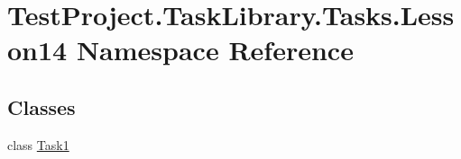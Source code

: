 \hypertarget{namespace_test_project_1_1_task_library_1_1_tasks_1_1_lesson14}{}\section{Test\+Project.\+Task\+Library.\+Tasks.\+Lesson14 Namespace Reference}
\label{namespace_test_project_1_1_task_library_1_1_tasks_1_1_lesson14}
\subsection*{Classes}
\begin{DoxyCompactItemize}
\item 
class \mbox{\hyperlink{class_test_project_1_1_task_library_1_1_tasks_1_1_lesson14_1_1_task1}{Task1}}
\end{DoxyCompactItemize}
